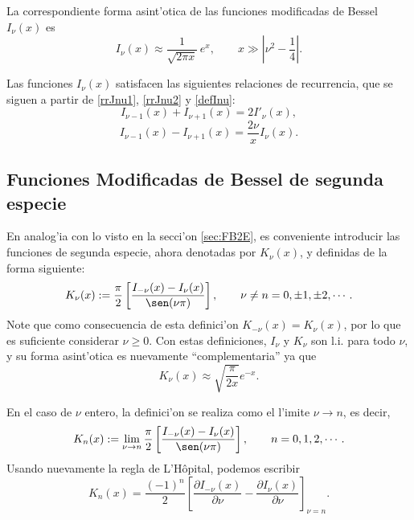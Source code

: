 La correspondiente forma asint'otica de las funciones modificadas de Bessel $I_\nu(x)$ es
\begin{equation}
I_\nu(x) \approx \frac{1}{\sqrt{2\pi x}}\,e^x, \qquad x\gg\left|\nu^2-\frac{1}{4}\right|.
\end{equation}

Las funciones $I_\nu(x)$ satisfacen las siguientes relaciones de recurrencia, que se siguen a partir de \eqref{rrJnu1}, \eqref{rrJnu2} y \eqref{defInu}:
\begin{equation}\label{rrInu1}
I_{\nu-1}(x)+I_{\nu+1}(x)=2I'_\nu(x),
\end{equation}
\begin{equation}\label{rrInu2}
I_{\nu-1}(x)-I_{\nu+1}(x)=\frac{2\nu}{x}I_\nu(x).
\end{equation}

\subsection{Funciones Modificadas de Bessel de segunda especie}
En analog'ia con lo visto en la secci'on \ref{sec:FB2E}, es conveniente introducir las funciones de segunda especie, ahora denotadas por $K_\nu(x)$, y definidas de la forma siguiente:
\begin{equation}\label{defKnu}
K_\nu(x) := \frac{\pi}{2}\left[\frac{I_{-\nu}(x)-I_\nu(x)}{\sen(\nu\pi)}\right], \qquad \nu\neq n=0,\pm 1,\pm 2, \cdots.
\end{equation}
Note que como consecuencia de esta definici'on $K_{-\nu}(x)=K_\nu(x)$, por lo que es suficiente considerar $\nu\ge 0$.
Con estas definiciones, $I_\nu$ y $K_\nu$ son l.i. para todo $\nu$, y su forma asint'otica es nuevamente ``complementaria'' ya que
\begin{equation}
K_\nu(x) \approx \sqrt{\frac{\pi}{2x}} e^{-x}.
\end{equation}

En el caso de $\nu$ entero, la definici'on se realiza como el l'imite $\nu\to n$, es decir,
\begin{equation}
K_n(x) := \lim_{\nu\to n}\frac{\pi}{2}\left[\frac{I_{-\nu}(x)-I_\nu(x)}{\sen(\nu\pi)}\right], \qquad  n=0,1,2, \cdots.
\end{equation}
Usando nuevamente la regla de L'H\^opital, podemos escribir
\begin{equation}\label{Knder}
K_n(x)=\frac{(-1)^n}{2}\left[\frac{\partial I_{-\nu}(x)}{\partial\nu}-\frac{\partial I_\nu(x)}{\partial\nu}\right]_{\nu=n}.
\end{equation}

